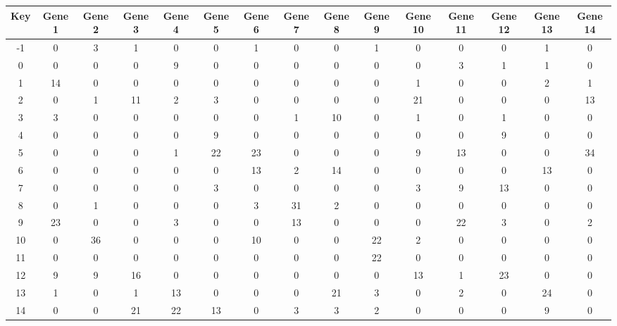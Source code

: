 \begin{tabular}{|c|c|c|c|c|c|c|c|c|c|c|c|c|c|c|}
\hline
Key & Gene 1 & Gene 2 & Gene 3 & Gene 4 & Gene 5 & Gene 6 & Gene 7 & Gene 8 & Gene 9 & Gene 10 & Gene 11 & Gene 12 & Gene 13 & Gene 14 \\
\hline
-1 & 0 & 3 & 1 & 0 & 0 & 1 & 0 & 0 & 1 & 0 & 0 & 0 & 1 & 0 \\
0 & 0 & 0 & 0 & 9 & 0 & 0 & 0 & 0 & 0 & 0 & 3 & 1 & 1 & 0 \\
1 & 14 & 0 & 0 & 0 & 0 & 0 & 0 & 0 & 0 & 1 & 0 & 0 & 2 & 1 \\
2 & 0 & 1 & 11 & 2 & 3 & 0 & 0 & 0 & 0 & 21 & 0 & 0 & 0 & 13 \\
3 & 3 & 0 & 0 & 0 & 0 & 0 & 1 & 10 & 0 & 1 & 0 & 1 & 0 & 0 \\
4 & 0 & 0 & 0 & 0 & 9 & 0 & 0 & 0 & 0 & 0 & 0 & 9 & 0 & 0 \\
5 & 0 & 0 & 0 & 1 & 22 & 23 & 0 & 0 & 0 & 9 & 13 & 0 & 0 & 34 \\
6 & 0 & 0 & 0 & 0 & 0 & 13 & 2 & 14 & 0 & 0 & 0 & 0 & 13 & 0 \\
7 & 0 & 0 & 0 & 0 & 3 & 0 & 0 & 0 & 0 & 3 & 9 & 13 & 0 & 0 \\
8 & 0 & 1 & 0 & 0 & 0 & 3 & 31 & 2 & 0 & 0 & 0 & 0 & 0 & 0 \\
9 & 23 & 0 & 0 & 3 & 0 & 0 & 13 & 0 & 0 & 0 & 22 & 3 & 0 & 2 \\
10 & 0 & 36 & 0 & 0 & 0 & 10 & 0 & 0 & 22 & 2 & 0 & 0 & 0 & 0 \\
11 & 0 & 0 & 0 & 0 & 0 & 0 & 0 & 0 & 22 & 0 & 0 & 0 & 0 & 0 \\
12 & 9 & 9 & 16 & 0 & 0 & 0 & 0 & 0 & 0 & 13 & 1 & 23 & 0 & 0 \\
13 & 1 & 0 & 1 & 13 & 0 & 0 & 0 & 21 & 3 & 0 & 2 & 0 & 24 & 0 \\
14 & 0 & 0 & 21 & 22 & 13 & 0 & 3 & 3 & 2 & 0 & 0 & 0 & 9 & 0 \\
\hline
\end{tabular}